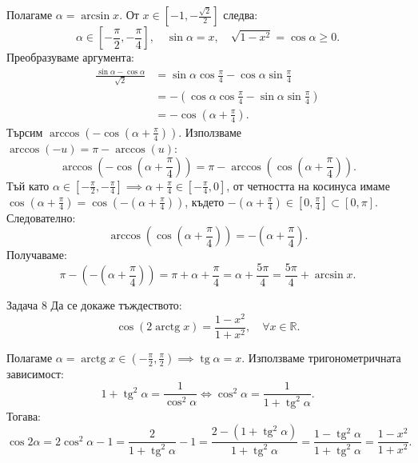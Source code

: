 \begin{solution}
Полагаме $\alpha = \arcsin x$. От $x \in \left[-1, -\frac{\sqrt{2}}{2}\right]$ следва:
\[
\alpha \in \left[-\frac{\pi}{2}, -\frac{\pi}{4}\right], \quad \sin\alpha = x, \quad \sqrt{1-x^2} = \cos\alpha \ge 0.
\]
Преобразуваме аргумента:
\begin{align*}
\frac{\sin\alpha - \cos\alpha}{\sqrt{2}} &= \sin\alpha\cos\frac{\pi}{4} - \cos\alpha\sin\frac{\pi}{4} \\
&= -\left(\cos\alpha\cos\frac{\pi}{4} - \sin\alpha\sin\frac{\pi}{4}\right) \\
&= -\cos\left(\alpha + \frac{\pi}{4}\right).
\end{align*}
Търсим $\arccos\left(-\cos\left(\alpha + \frac{\pi}{4}\right)\right)$. Използваме $\arccos(-u) = \pi - \arccos(u)$:
\[
\arccos\left(-\cos\left(\alpha + \frac{\pi}{4}\right)\right) = \pi - \arccos\left(\cos\left(\alpha + \frac{\pi}{4}\right)\right).
\]
Тъй като $\alpha \in \left[-\frac{\pi}{2}, -\frac{\pi}{4}\right] \implies \alpha + \frac{\pi}{4} \in \left[-\frac{\pi}{4}, 0\right]$, от четността на косинуса имаме $\cos\left(\alpha + \frac{\pi}{4}\right) = \cos\left(-\left(\alpha + \frac{\pi}{4}\right)\right)$, където $-\left(\alpha + \frac{\pi}{4}\right) \in \left[0, \frac{\pi}{4}\right] \subset [0, \pi]$.
Следователно:
\[
\arccos\left(\cos\left(\alpha + \frac{\pi}{4}\right)\right) = -\left(\alpha + \frac{\pi}{4}\right).
\]
Получаваме:
\[
\pi - \left(-\left(\alpha + \frac{\pi}{4}\right)\right) = \pi + \alpha + \frac{\pi}{4} = \alpha + \frac{5\pi}{4} = \frac{5\pi}{4} + \arcsin x.
\]
\end{solution}

\begin{problembox}{Задача 8}
Да се докаже тъждеството:
\[
\cos(2\operatorname{arctg} x) = \frac{1-x^2}{1+x^2}, \quad \forall x \in \mathbb{R}.
\]
\end{problembox}

\begin{solution}
Полагаме $\alpha = \operatorname{arctg} x \in \left(-\frac{\pi}{2}, \frac{\pi}{2}\right) \implies \operatorname{tg}\alpha = x$.
Използваме тригонометричната зависимост:
\[
1 + \operatorname{tg}^2\alpha = \frac{1}{\cos^2\alpha} \iff \cos^2\alpha = \frac{1}{1+\operatorname{tg}^2\alpha}.
\]
Тогава:
\[
\cos 2\alpha = 2\cos^2\alpha - 1 = \frac{2}{1+\operatorname{tg}^2\alpha} - 1 = \frac{2 - (1+\operatorname{tg}^2\alpha)}{1+\operatorname{tg}^2\alpha} = \frac{1-\operatorname{tg}^2\alpha}{1+\operatorname{tg}^2\alpha} = \frac{1-x^2}{1+x^2}.
\]
\end{solution}

